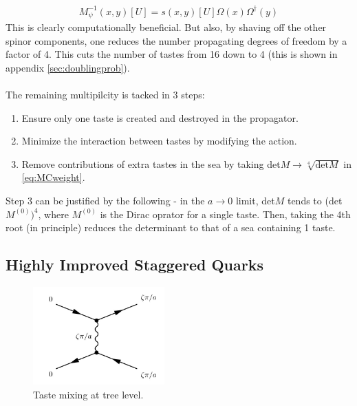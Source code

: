 \begin{align}
	M_{\psi}^{-1}(x,y)[U] = s(x,y)[U] \Omega(x) \Omega^{\dagger}(y)
\end{align}
This is clearly computationally beneficial. But also, by shaving off the other spinor components, one reduces the number propagating degrees of freedom by a factor of 4. This cuts the number of tastes from 16 down to 4 (this is shown in appendix \ref{sec:doublingprob}).
\\ \\
The remaining multipilcity is tacked in 3 steps:
\begin{enumerate}
	\item
	Ensure only one taste is created and destroyed in the propagator.
	\item
	Minimize the interaction between tastes by modifying the action.
	\item
	Remove contributions of extra tastes in the sea by taking det$M \to \sqrt[4]{\text{det}M}$ in \eqref{eq:MCweight}.
\end{enumerate}
Step 3 can be justified by the following - in the $a\to 0$ limit, det$M$ tends to (det$M^{(0)})^4$, where $M^{(0)}$ is the Dirac oprator for a single taste. Then, taking the 4th root (in principle) reduces the determinant to that of a sea containing 1 taste.

\subsection{Highly Improved Staggered Quarks}

{}

\begin{figure}
  \begin{center}
    \includegraphics[width=
   0.45\textwidth]{images/tastemixing.jpg}
  \end{center}
  \caption{Taste mixing at tree level.}
  \label{fig:tastemixing}
\end{figure}

